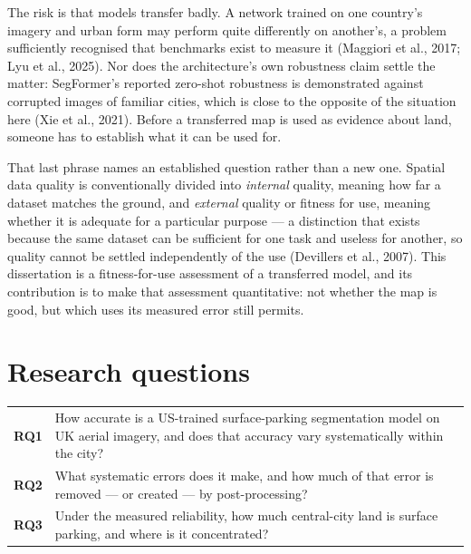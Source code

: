 The risk is that models transfer badly. A network trained on one country's imagery and urban form may perform quite differently on another's, a problem sufficiently recognised that benchmarks exist to measure it (Maggiori et al., 2017; Lyu et al., 2025). Nor does the architecture's own robustness claim settle the matter: SegFormer's reported zero-shot robustness is demonstrated against corrupted images of familiar cities, which is close to the opposite of the situation here (Xie et al., 2021). Before a transferred map is used as evidence about land, someone has to establish what it can be used for.

That last phrase names an established question rather than a new one. Spatial data quality is conventionally divided into \emph{internal} quality, meaning how far a dataset matches the ground, and \emph{external} quality or fitness for use, meaning whether it is adequate for a particular purpose --- a distinction that exists because the same dataset can be sufficient for one task and useless for another, so quality cannot be settled independently of the use (Devillers et al., 2007). This dissertation is a fitness-for-use assessment of a transferred model, and its contribution is to make that assessment quantitative: not whether the map is good, but which uses its measured error still permits.

\hypertarget{research-questions}{%
\section{Research questions}\label{research-questions}}

\par\addvspace{\medskipamount}\noindent
\begin{longtable}[]{@{}
  >{\raggedright\arraybackslash}p{}
  >{\raggedright\arraybackslash}p{}@{}}
\toprule
\endhead
\textbf{RQ1} & How
accurate is a
US-trained
surface-parking
segmentation model
on UK aerial
imagery, and does
that accuracy vary
systematically
within the city? \\
\textbf{RQ2} & What
systematic errors
does it make, and
how much of that
error is removed ---
or created --- by
post-processing? \\
\textbf{RQ3} & Under
the measured
reliability, how
much central-city
land is surface
parking, and where
is it
concentrated? \\
\bottomrule
\end{longtable}
\par\addvspace{\medskipamount}\restoreparskip

